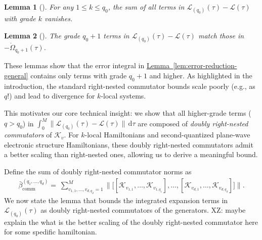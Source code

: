 \documentclass[11pt]{article}
\newtheorem{lemma}{Lemma}
\newcommand{\lem}[1]{\hyperref[lem:#1]{Lemma~\ref*{lem:#1}}}
\renewcommand{\d}{\mathrm{d}}
\renewcommand{\comm}{\mathrm{comm}}
\newcommand{\mc}{\mathcal}
\newcommand{\xz}[1]{{\color{cyan} XZ: #1}}
\begin{document}
\begin{lemma}[{\cite[Proposition~3]{fang2025high}}]
\label{lem:grade-cond}
 For any $1\le k\le q_0$, the sum of all terms in $\mc L_{(q_0)}(\tau) -\mc L(\tau)$ with grade $k$ vanishes. 
\end{lemma} 
\begin{lemma}[{\cite[Lemma~4]{fang2025high}}]
\label{lem:grade-cond-q+1}
 The grade $q_0+1$ terms in $\mc L_{(q_0)}(\tau) -\mc L(\tau)$ match those in $-\dot\Omega_{q_0+1}(\tau)$.
\end{lemma}

These lemmas show that the error integral in \lem{error-reduction-general} contains only terms with grade $q_0+1$ and higher. As highlighted in the introduction, the standard right-nested commutator bounds scale poorly (e.g., as $q!$) and lead to divergence for $k$-local systems. 

This motivates our core technical insight: we show that all higher-grade terms ($q > q_0$) in $\int_{0}^{M}\| \mc L_{(q_0)}(\tau)-\mc L(\tau)\|\,\d \tau$ are composed of \emph{doubly right-nested commutators} of $\mc K_v$. For $k$-local Hamiltonians and second-quantized plane-wave electronic structure Hamiltonians, these doubly right-nested commutators admit a better scaling than right-nested ones, allowing us to derive a meaningful bound.

Define the sum of doubly right-nested commutator norms as
\begin{align}
\label{eq:def-beta-bar-general}
    \bar{\beta}_{\comm}^{(q_1, \ldots, q_{d})}
    =~ 
    \sum_{v_{1,1}, \ldots, v_{d, q_{d}} = 1}^M \bigg\| \Big[ 
         [\mc K_{v_{1,1}}, \ldots, \mc K_{v_{1,q_1}}], \ldots, 
        [\mc K_{v_{d,1}}, \ldots, \mc K_{v_{d,q_{d}}}]
     \Big] \bigg\|.
\end{align} We now state the lemma that bounds the integrated expansion terms in $\mc{L}_{(q_0)}(\tau)$ as doubly right-nested commutators of the generators. \xz{maybe explain the what is the better scaling of the doubly right-nested commutator here for some spedific hamiltonian.}
\end{document}
